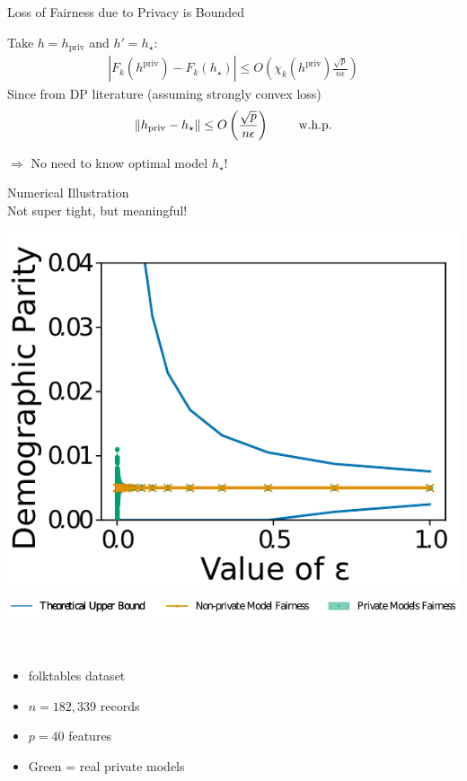 \documentclass[aspectratio=169,14pt]{beamer}
\begin{document}
\begin{frame}{Loss of Fairness due to Privacy is Bounded} 
  \vspace{-0.5em}

  Take $h = h_{\text{priv}}$ and $h'= h_\star$:
  \begin{align*}
    | F_k(h^{\text{priv}}) - F_k(h_\star) |
    \le
    O\left(
    \chi_k (h^{\text{priv}}) \frac{\sqrt{p}}{n \epsilon}
    \right)   
  \end{align*}
  Since from DP literature (assuming strongly convex loss)
  \begin{align*}
    \left\| h_{\text{priv}} - h_\star\right\| \le O\left( \frac{\sqrt{p}}{n \epsilon} \right) \qquad \text{ w.h.p.}
  \end{align*}

  \vspace{-1em}
  
  \Large
  $\Rightarrow$ No need to know optimal model $h_\star$!
  
  \vspace{0.5em}
\end{frame}


\begin{frame}{Numerical Illustration\\[-0.5em]
  \Large Not super tight, but meaningful!}
  \begin{minipage}{0.5\linewidth}
    \includegraphics[width=\textwidth]{images/numeric.png}
    \includegraphics[width=\textwidth]{images/legend.png}
  \end{minipage}%
  ~~~~~~
  \begin{minipage}{0.5\linewidth}
    \begin{itemize}
    \item folktables dataset
    \item $n= 182, 339$ records
    \item $p = 40$ features
    \item Green = real private models
    \end{itemize}
  \end{minipage}%
\end{frame}
\end{document}
